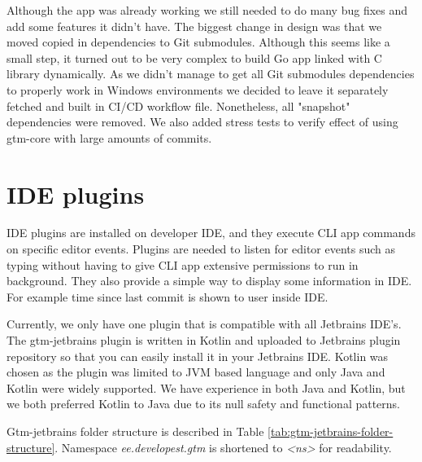 Although the app was already working we still needed to do many bug fixes and add some features it didn't have.
The biggest change in design was that we moved copied in dependencies to Git submodules.
Although this seems like a small step, it turned out to be very complex to build Go app linked with C library dynamically.
As we didn't manage to get all Git submodules dependencies to properly work in Windows environments
we decided to leave it separately fetched and built in CI/CD workflow file.
Nonetheless, all "snapshot" dependencies were removed.
We also added stress tests to verify effect of using gtm-core with large amounts of commits.

\section{IDE plugins}\label{sec:ide-plugins}
IDE plugins are installed on developer IDE, and they execute CLI app commands on specific editor events.
Plugins are needed to listen for editor events such as typing without having to give CLI app extensive permissions to run in background.
They also provide a simple way to display some information in IDE.
For example time since last commit is shown to user inside IDE.

Currently, we only have one plugin that is compatible with all Jetbrains IDE's.
The gtm-jetbrains plugin is written in Kotlin and uploaded to Jetbrains plugin repository so that you can easily install it in your Jetbrains IDE.
Kotlin was chosen as the plugin was limited to JVM based language and only Java and Kotlin were widely supported.
We have experience in both Java and Kotlin, but we both preferred Kotlin to Java due to its null safety and functional patterns.

Gtm-jetbrains folder structure is described in Table
\ref{tab:gtm-jetbrains-folder-structure}.
Namespace \textit{ee.developest.gtm} is shortened to \textit{<ns>} for readability.

